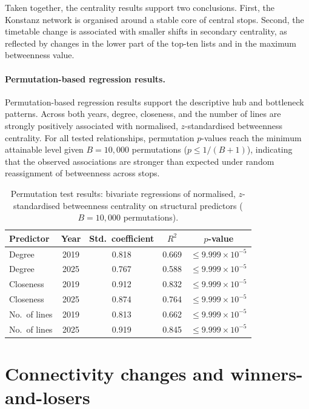 \documentclass[12pt,a4paper,oneside]{report}
\begin{document}
Taken together, the centrality results support two conclusions.
First, the Konstanz network is organised around a stable core of central stops.
Second, the timetable change is associated with smaller shifts in secondary centrality, as reflected by changes in the lower part of the top-ten lists and in the maximum betweenness value.

\paragraph{Permutation-based regression results.}

Permutation-based regression results support the descriptive hub and bottleneck patterns.
Across both years, degree, closeness, and the number of lines are strongly positively associated with normalised, $z$-standardised betweenness centrality.
For all tested relationships, permutation $p$-values reach the minimum attainable level given $B = 10{,}000$ permutations ($p \leq 1/(B+1)$), indicating that the observed associations are stronger than expected under random reassignment of betweenness across stops.

\begin{table}[htbp]
  \centering
  \caption{Permutation test results: bivariate regressions of normalised, $z$-standardised betweenness centrality on structural predictors ($B = 10{,}000$ permutations).}\label{tab:permutation}
  \begin{tabular}{@{} l c c c c @{}}
    \toprule
    Predictor & Year & Std.\ coefficient & $R^{2}$ & $p$-value \\
    \midrule
    Degree    & 2019 & 0.818 & 0.669 & $\leq 9.999 \times 10^{-5}$ \\
    Degree    & 2025 & 0.767 & 0.588 & $\leq 9.999 \times 10^{-5}$ \\
    Closeness & 2019 & 0.912 & 0.832 & $\leq 9.999 \times 10^{-5}$ \\
    Closeness & 2025 & 0.874 & 0.764 & $\leq 9.999 \times 10^{-5}$ \\
    No.\ of lines & 2019 & 0.813 & 0.662 & $\leq 9.999 \times 10^{-5}$ \\
    No.\ of lines & 2025 & 0.919 & 0.845 & $\leq 9.999 \times 10^{-5}$ \\
    \bottomrule
  \end{tabular}
\end{table}

\section{Connectivity changes and winners-and-losers}\label{sec:connectivity-changes}
\end{document}
